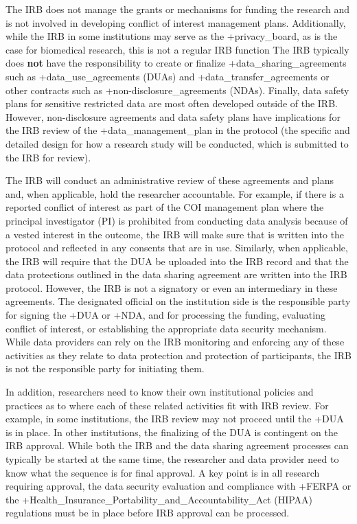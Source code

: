 \documentclass[
]{book}
\begin{document}
The IRB does not manage the grants or mechanisms for funding the research and is not involved in developing conflict of interest management plans. Additionally, while the IRB in some institutions may serve as the +privacy\_board\textbar, as is the case for biomedical research, this is not a regular IRB function The IRB typically does \textbf{not} have the responsibility to create or finalize +data\_sharing\_agreements\textbar{} such as +data\_use\_agreements\textbar{} (DUAs) and +data\_transfer\_agreements\textbar{} or other contracts such as +non-disclosure\_agreements\textbar{} (NDAs). Finally, data safety plans for sensitive restricted data are most often developed outside of the IRB. However, non-disclosure agreements and data safety plans have implications for the IRB review of the +data\_management\_plan\textbar{} in the protocol (the specific and detailed design for how a research study will be conducted, which is submitted to the IRB for review).

The IRB will conduct an administrative review of these agreements and plans and, when applicable, hold the researcher accountable. For example, if there is a reported conflict of interest as part of the COI management plan where the principal investigator (PI) is prohibited from conducting data analysis because of a vested interest in the outcome, the IRB will make sure that is written into the protocol and reflected in any consents that are in use. Similarly, when applicable, the IRB will require that the DUA be uploaded into the IRB record and that the data protections outlined in the data sharing agreement are written into the IRB protocol. However, the IRB is not a signatory or even an intermediary in these agreements. The designated official on the institution side is the responsible party for signing the +DUA\textbar{} or +NDA\textbar, and for processing the funding, evaluating conflict of interest, or establishing the appropriate data security mechanism. While data providers can rely on the IRB monitoring and enforcing any of these activities as they relate to data protection and protection of participants, the IRB is not the responsible party for initiating them.

In addition, researchers need to know their own institutional policies and practices as to where each of these related activities fit with IRB review. For example, in some institutions, the IRB review may not proceed until the +DUA\textbar{} is in place. In other institutions, the finalizing of the DUA is contingent on the IRB approval. While both the IRB and the data sharing agreement processes can typically be started at the same time, the researcher and data provider need to know what the sequence is for final approval. A key point is in all research requiring approval, the data security evaluation and compliance with +FERPA\textbar{} or the +Health\_Insurance\_Portability\_and\_Accountability\_Act\textbar{} (HIPAA) regulations must be in place before IRB approval can be processed.
\end{document}
